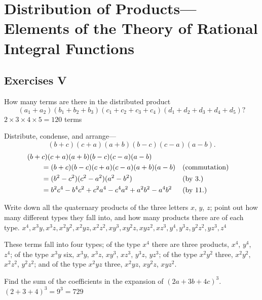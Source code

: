 \documentclass[DIN, pagenumber=false, fontsize=11pt, parskip=half]{scrartcl}
\title{}
\author{} %
\date{}
\begin{document}
\maketitle

\setcounter{section}{3}
\section{Distribution of Products---Elements of the Theory of Rational Integral Functions}


\subsection{Exercises V}

\begin{problems}[from=1,step=1]
    \problem[1] How many terms are there in the distributed product
    \[
        (a_1+a_2)(b_1+b_2+b_3)(c_1+c_2+c_3+c_4)(d_1+d_2+d_3+d_4+d_5)?
    \]
    \answer $2 \times 3 \times 4 \times 5 = 120$ terms

    \problem[6] Distribute, condense, and arrange---
    \[
        (b+c)(c+a)(a+b)(b-c)(c-a)(a-b).
    \]
    \answer 
    \begin{align*}
        \MoveEqLeft
        (b+c)(c+a)(a+b)(b-c)(c-a)(a-b) \\ 
        &= (b+c)(b-c)(c+a)(c-a)(a+b)(a-b) && \text{(commutation)}\\ 
        &= (b^2-c^2)(c^2-a^2)(a^2-b^2) && \text{(by 3.)}\\ 
        &= b^2c^4-b^4c^2+c^2a^4-c^4a^2+a^2b^2-a^4b^2 && \text{(by 11.)}
    \end{align*}

    \problem[11] Write down all the quaternary products of the three letters $x$, $y$, $z$; point out how many different types they fall into, and how many products there are of each type.
    \answer $x^4, x^3y, x^3z, x^2y^2, x^2yz, x^2z^2, xy^3, xy^2z, xyz^2, xz^3, y^4, y^3z, y^2z^2, yz^3, z^4$

    These terms fall into four types;
    of the type $x^4$ there are three products, $x^4$, $y^4$, $z^4$; of the type $x^3y$ six, $x^3y$, $x^3z$, $xy^3$, $xz^3$, $y^3z$, $yz^3$; of the type $x^2y^2$ three, $x^2y^2$, $x^2z^2$, $y^2z^2$; and of the type $x^2yz$ three, $x^2yz$, $xy^2z$, $xyz^2$.

    \problem[13] Find the sum of the coefficients in the expansion of $(2a+3b+4c)^3$.
    \answer $(2+3+4)^3 = 9^3 = 729$


\end{problems}
\end{document}
